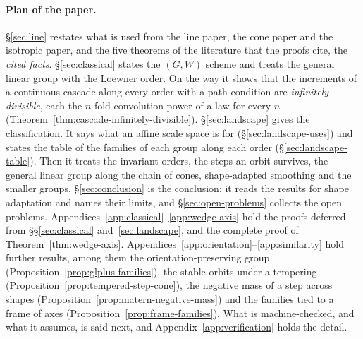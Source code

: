 \paragraph{Plan of the paper.} \S\ref{sec:line} restates what is used from the line paper, the cone
paper and the isotropic paper, and the five theorems of the literature that the proofs cite, the
\emph{cited facts}. \S\ref{sec:classical} states the $(G, W)$ scheme and treats the general linear
group with the Loewner order.
On the way it shows that the increments of a continuous cascade along every order with a path condition are
\emph{infinitely divisible}, each
the $n$-fold convolution power of a law for every $n$ (Theorem~\ref{thm:cascade-infinitely-divisible}).
\S\ref{sec:landscape} gives the classification. It says what an affine scale space is for
(\S\ref{sec:landscape-uses}) and states the table of the families of each group along each order
(\S\ref{sec:landscape-table}). Then it treats the invariant orders, the steps an orbit survives, the
general linear group along the chain of cones, shape-adapted smoothing and the smaller groups.
\S\ref{sec:conclusion} is the conclusion: it reads the results for shape adaptation and names their
limits, and \S\ref{sec:open-problems} collects the open problems.
Appendices~\ref{app:classical}--\ref{app:wedge-axis} hold the proofs deferred from
\S\S\ref{sec:classical} and~\ref{sec:landscape}, and the complete proof of
Theorem~\ref{thm:wedge-axis}. Appendices~\ref{app:orientation}--\ref{app:similarity} hold further
results, among them the orientation-preserving group (Proposition~\ref{prop:glplus-families}), the
stable orbits under a tempering (Proposition~\ref{prop:tempered-step-cone}), the negative mass of a
\Matern{} step across shapes (Proposition~\ref{prop:matern-negative-mass}) and the families tied to a
frame of axes (Proposition~\ref{prop:frame-families}). What is machine-checked, and what it assumes, is
said next, and Appendix~\ref{app:verification} holds the detail.

